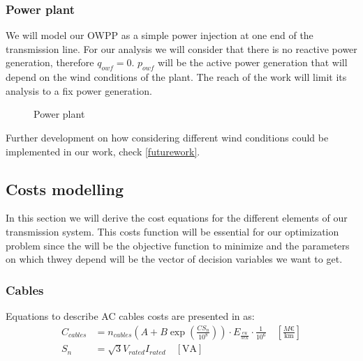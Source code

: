 \documentclass[a4paper,11pt, titlepage, twoside]{article}
\begin{document}
\subsubsection{Power plant}
We will model our OWPP as a simple power injection at one end of the transmission line. For our
analysis we will consider that there is no reactive power generation, therefore $q_{owf} = 0$. $p_{owf}$ will be the active power generation that will depend 
on the wind conditions of the plant. The reach of the work will limit its analysis to a fix power generation.
\begin{figure}[H]
\centering
{}
\caption{Power plant}
\label{fig:powerplant}
\end{figure}
Further development on how considering different wind conditions could be implemented in our work, check \ref{futurework}.


\subsection{Costs modelling}

In this section we will derive the cost equations for the different elements of our transmission system. This costs function will be essential for our optimization problem since
the will be the objective function to minimize and the parameters on which thwey depend will be the vector of decision variables we want to get.
\subsubsection{Cables}

Equations to describe AC cables costs are presented in \cite{chalmers} as:
\begin{align}
    C_{cables} &= n_{cables} (A + B \exp(\frac{CS_n}{10^8})) \cdot E_{\frac{eu}{sek}} \cdot \frac{1}{10^6} \quad \left[\frac{M\euro}{\text{km}}\right] \\
    S_n &= \sqrt{3}V_{rated}I_{rated} \quad \left[\text{VA}\right]
\end{align}
\end{document}
